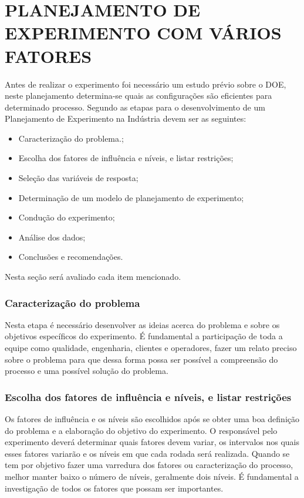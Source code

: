 \chapter{PLANEJAMENTO DE EXPERIMENTO COM VÁRIOS FATORES}
\label{chap:estudo}

Antes de realizar o experimento foi necessário um estudo prévio sobre o \ac{DOE}, neste planejamento determina-se quais as configurações são eficientes para determinado processo.
Segundo \cite{coleman1993systematic}  as etapas para o desenvolvimento de um Planejamento de Experimento na Indústria devem ser as seguintes:
\begin{itemize}
    \item Caracterização do problema.;
    \item Escolha dos fatores de influência e níveis, e listar restrições;
    \item Seleção das variáveis de resposta;
    \item Determinação de um modelo de planejamento de experimento;
    \item Condução do experimento;
    \item Análise dos dados;
    \item Conclusões e recomendações.
\end{itemize}
Nesta seção será avaliado cada item mencionado.

\subsection{Caracterização do problema}
Nesta etapa é necessário desenvolver as ideias acerca do problema e sobre os objetivos específicos do experimento. É  fundamental a participação de toda a equipe como qualidade, engenharia, clientes e operadores, fazer um relato preciso sobre o problema para que dessa forma possa ser possível a compreensão do processo e uma possível solução do problema.

\subsection{Escolha dos fatores de influência e níveis, e listar restrições}
Os fatores de influência e os níveis são escolhidos após se obter uma boa definição do problema e a elaboração do objetivo do experimento. O responsável pelo experimento deverá determinar quais fatores devem variar, os intervalos nos quais esses fatores variarão e os níveis em que cada rodada será realizada. Quando se tem por objetivo fazer uma varredura dos fatores ou caracterização do processo, melhor manter baixo o número de níveis, geralmente dois níveis. É fundamental a investigação de todos os fatores que possam ser importantes.

